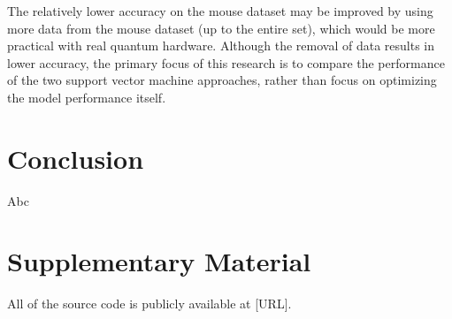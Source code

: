\documentclass{article}
\begin{document}
    The relatively lower accuracy on the mouse dataset may be improved by using more data from the mouse dataset (up to the entire set), which would be more practical with real quantum hardware. Although the removal of data results in lower accuracy, the primary focus of this research is to compare the performance of the two support vector machine approaches, rather than focus on optimizing the model performance itself.

\section{Conclusion}
  Abc

\section{Supplementary Material}
All of the source code is publicly available at [URL].
\end{document}

